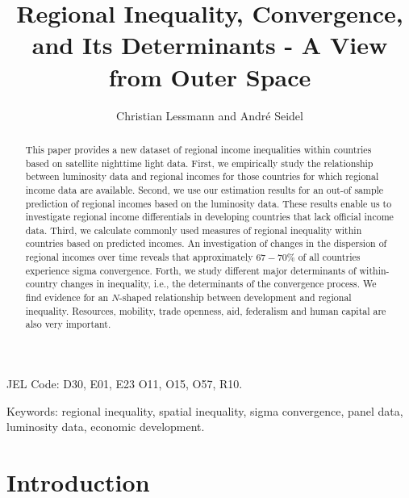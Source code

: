 \documentclass[10pt]{article}
\title{Regional Inequality, Convergence, and Its Determinants - A View from Outer Space }
\author{Christian Lessmann  and André Seidel}
\date{}
\begin{document}
\maketitle


\begin{abstract}
This paper provides a new dataset of regional income inequalities within countries based on satellite nighttime light data. 
First, we empirically study the relationship between luminosity data and regional incomes for those countries for which regional income data are available. 
Second, we use our estimation results for an out-of sample prediction of regional incomes based on the luminosity data. 
These results enable us to investigate regional income differentials in developing countries that lack official income data. 
Third, we calculate commonly used measures of regional inequality within countries based on predicted incomes. 
An investigation of changes in the dispersion of regional incomes over time reveals that approximately $67-70 \%$ of all countries experience sigma convergence.
Forth, we study different major determinants of within-country changes in inequality, i.e., the determinants of the convergence process. 
We find evidence for an $N$-shaped relationship between development and regional inequality. 
Resources, mobility, trade openness, aid, federalism and human capital are also very important.
\end{abstract}

\vspace{1cm}

\noindent JEL Code: D30, E01, E23 O11, O15, O57, R10.


\noindent Keywords: regional inequality, spatial inequality, sigma convergence, panel data, luminosity data, economic development.

\newpage

\section{Introduction}
\end{document}
